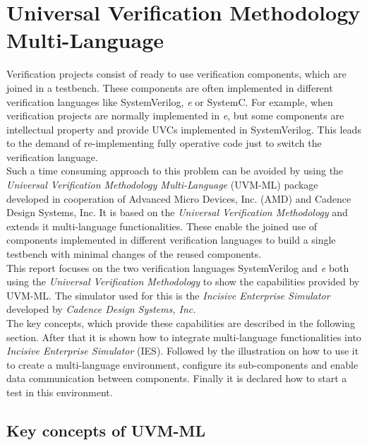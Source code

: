 \section{Universal Verification Methodology Multi-Language}\label{uvm_ml}
Verification projects consist of ready to use verification components, which are joined in a testbench. These components
are often implemented in different verification languages like SystemVerilog, \textit{e} or SystemC. For
example, when verification projects are normally implemented in \textit{e}, but some components are intellectual
property and provide UVCs implemented in SystemVerilog. This leads to the demand of re-implementing fully
operative code just to switch the verification language.\\
Such a time consuming approach to this problem can be avoided by using the \emph{Universal Verification Methodology
Multi-Language} (UVM-ML) \cite{uvm_ml_user} package developed in cooperation of Advanced Micro Devices, Inc. (AMD) and Cadence Design
Systems, Inc. It is based on the \emph{Universal Verification Methodology} and extends it multi-language
functionalities. These enable the joined use of components implemented in different verification languages to build a
single testbench with minimal changes of the reused components.\\
This report focuses on the two verification languages SystemVerilog and \textit{e} both using the \emph{Universal
Verification Methodology} to show the capabilities provided by UVM-ML. The simulator used for this is the
\emph{Incisive Enterprise Simulator} developed by \emph{Cadence Design Systems, Inc.}\\
The key concepts, which provide these capabilities are described in the following section. After that it is shown how to
integrate multi-language functionalities into \emph{Incisive Enterprise Simulator} (IES). Followed by the illustration on how
to use it to create a multi-language environment, configure its sub-components and enable data communication between
components. Finally it is declared how to start a test in this environment.

\subsection{Key concepts of UVM-ML}

